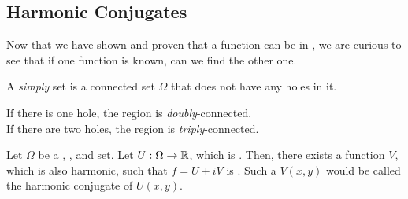 \subsection{Harmonic Conjugates}\label{subsec:Harmonic_Conjugates}
Now that we have shown and proven that a function can be  in , we are curious to see that if one function is known, can we find the other one.

\begin{definition}\label{def:Simply_Connected}
  A \emph{simply}  set is a connected set $\Omega$ that does not have any holes in it.

  \begin{remark}\label{rmk:Multiply_Connected}
    If there is one hole, the region is \emph{doubly}-connected. \\
    If there are two holes, the region is \emph{triply}-connected.
  \end{remark}
\end{definition}

\begin{theorem}\label{thm:Harmonic_Conjugate}
  Let $\Omega$ be a , , and  set.
  Let $U: \Omega \to \operatorname{\mathbb{R}}$, which is .
  Then, there exists a function $V$, which is also harmonic, such that $f = U + iV$ is .
  Such a $V(x, y)$ would be called the harmonic conjugate of $U(x, y)$.
\end{theorem}

